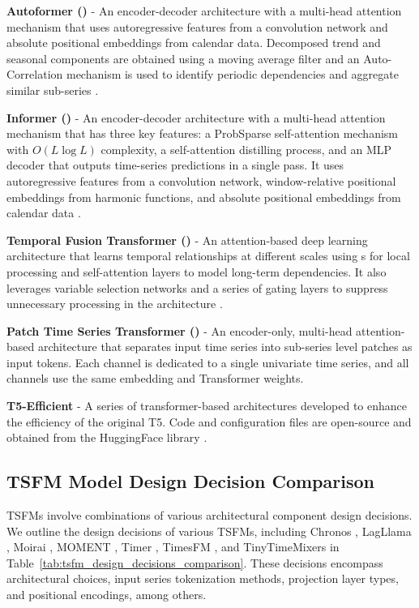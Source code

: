 \noindent\textbf{Autoformer (\Autoformer)} - An encoder-decoder architecture with a multi-head attention mechanism that uses autoregressive features from a convolution network and absolute positional embeddings from calendar data. Decomposed trend and seasonal components are obtained using a moving average filter and an Auto-Correlation mechanism is used to identify periodic dependencies and aggregate similar sub-series \citep{wu_2021_autoformer, vaswani_2021_attentionisallyouneed}.

\noindent\textbf{Informer (\Informer)} - An encoder-decoder architecture with a multi-head attention mechanism that has three key features: a ProbSparse self-attention mechanism with \(O(L \log L)\) complexity, a self-attention distilling process, and an MLP decoder that outputs time-series predictions in a single pass. It uses autoregressive features from a convolution network, window-relative positional embeddings from harmonic functions, and absolute positional embeddings from calendar data \citep{zhou2021informerefficienttransformerlong, 
vaswani_2021_attentionisallyouneed}.

\noindent\textbf{Temporal Fusion Transformer (\TFT)} - An attention-based deep learning architecture that learns temporal relationships at different scales using \LSTM s for local processing and self-attention layers to model long-term dependencies. It also leverages variable selection networks and a series of gating layers to suppress unnecessary processing in the architecture \citep{lim2021_tft}. 

\noindent\textbf{Patch Time Series Transformer (\PatchTST)} - An encoder-only, multi-head attention-based architecture that separates input time series into sub-series level patches as input tokens. Each channel is dedicated to a single univariate time series, and all channels use the same embedding and Transformer weights. \cite{nie2023patchtst}

\noindent\textbf{T5-Efficient} - A series of transformer-based architectures developed to enhance the efficiency of the original T5. Code and configuration files are open-source and obtained from the HuggingFace library \citep{wolf_2020_hgtransformers}.


\pagebreak
\subsection{TSFM Model Design Decision Comparison}\label{apd:TSFM_model_decision_decisions_comparison}
TSFMs involve combinations of various architectural component design decisions. We outline the design decisions of various TSFMs, including Chronos \citep{aws2024chronos, ansari2024chronos}, LagLlama \citep{rasul2024lagllama}, Moirai \citep{moirai2024}, MOMENT \citep{goswami2024moment}, Timer \citep{liutimer}, TimesFM \citep{das2024TimesFM}, and TinyTimeMixers \citep{ekambaram2024ttms} in Table~\ref{tab:tsfm_design_decisions_comparison}. These decisions encompass architectural choices, input series tokenization methods, projection layer types, and positional encodings, among others.



